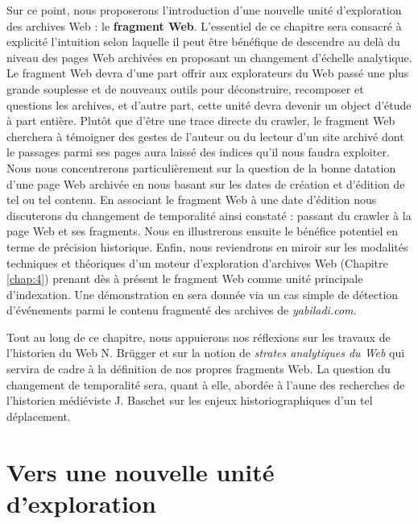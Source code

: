 \documentclass[symmetric,justified,marginals=raggedouter]{tufte-book}
\begin{document}
Sur ce point, nous proposerons l'introduction d'une nouvelle unité d'exploration des archives Web : le \textbf{fragment Web}. L'essentiel de ce chapitre sera consacré à explicité l'intuition selon laquelle il peut être bénéfique de descendre au delà du niveau des pages Web archivées en proposant un changement d'échelle analytique. Le fragment Web devra d'une part offrir aux explorateurs du Web passé une plus grande souplesse et de nouveaux outils pour déconstruire, recomposer et questions les archives, et d'autre part, cette unité devra devenir un object d'étude à part entière. Plutôt que d'être une trace directe du crawler, le fragment Web cherchera à témoigner des gestes de l'auteur ou du lecteur d'un site archivé dont le passages parmi ses pages aura laissé des indices qu'il nous faudra exploiter. Nous nous concentrerons particulièrement sur la question de la bonne datation d'une page Web archivée en nous basant sur les dates de création et d'édition de tel ou tel contenu. En associant le fragment Web à une date d'édition nous discuterons du changement de temporalité ainsi constaté : passant du crawler à la page Web et ses fragments. Nous en illustrerons ensuite le bénéfice potentiel en terme de précision historique. Enfin, nous reviendrons en miroir sur les modalités techniques et théoriques d'un moteur d'exploration d'archives Web (Chapitre \ref{chap:4}) prenant dès à présent le fragment Web comme unité principale d'indexation. Une démonstration en sera donnée via un cas simple de détection d'événements parmi le contenu fragmenté des archives de \textit{yabiladi.com}.  

Tout au long de ce chapitre, nous appuierons nos réflexions sur les travaux de l'historien du Web N. Brügger et sur la notion de \textit{strates analytiques du Web} qui servira de cadre à la définition de nos propres fragments Web. La question du changement de temporalité sera, quant à elle, abordée à l'aune des recherches de l'historien médiéviste J. Baschet sur les enjeux historiographiques d'un tel déplacement.  

\section{Vers une nouvelle unité d'exploration}
\end{document}

